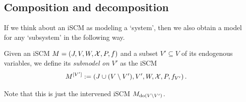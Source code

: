 \subsection{Composition and decomposition}

If we think about an iSCM as modeling a `system', then we also obtain a model for any `subsystem' in the following way.
\begin{Def}\label{def:sub_scm}
  Given an iSCM $M = \left ( J, V, W, \mathcal{X}, P, f \right )$ and a subset $V' \subseteq V$ of its endogenous variables, we define its \emph{submodel on $V'$} as the iSCM
  $$M^{[V']} := \left ( J \cup (V \setminus V'), V', W,\mathcal{X},P,f_{V'} \right ).$$
\end{Def}
\begin{Rem}
  Note that this is just the intervened iSCM $M_{\operatorname{do}(V \setminus V')}$.
\end{Rem}


